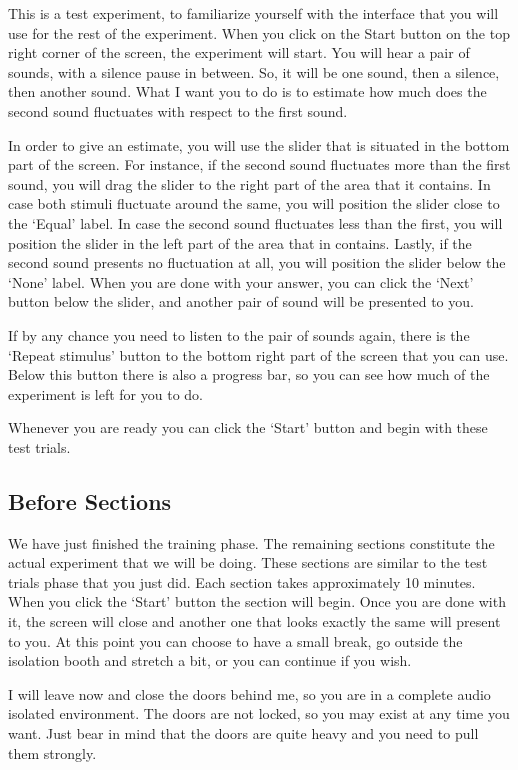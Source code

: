 \documentclass[a4paper]{article}
\begin{document}
This is a test experiment, to familiarize yourself with the interface that you
will use for the rest of the experiment. When you click on the Start button
on the top right corner of the screen, the experiment will start. You will
hear a pair of sounds, with a silence pause in between. So, it will be one
sound, then a silence, then another sound. What I want you to do is to estimate
how much does the second sound fluctuates with respect to the first sound.

In order to give an estimate, you will use the slider that is situated in the
bottom part of the screen. For instance, if the second sound fluctuates more
than the first sound, you will drag the slider to the right part of the area
that it contains. In case both stimuli fluctuate around the same, you will
position the slider close to the `Equal' label. In case the second sound
fluctuates less than the first, you will position the slider in the left part
of the area that in contains. Lastly, if the second sound presents no
fluctuation at all, you will position the slider below the `None' label. When
you are done with your answer, you can click the `Next' button below the slider,
and another pair of sound will be presented to you.

If by any chance you need to listen to the pair of sounds again, there is the
`Repeat stimulus' button to the bottom right part of the screen that you can
use. Below this button there is also a progress bar, so you can see how much of
the experiment is left for you to do.

Whenever you are ready you can click the `Start' button and begin with these
test trials.


\subsection{Before Sections} %
\label{sub:before_sections}

We have just finished the training phase. The remaining sections constitute the
actual experiment that we will be doing. These sections are similar to the test
trials phase that you just did. Each section takes approximately 10 minutes.
When you click the `Start' button the section will begin. Once you are done with
it, the screen will close and another one that looks exactly the same will
present to you. At this point you can choose to have a small break, go outside
the isolation booth and stretch a bit, or you can continue if you wish.

I will leave now and close the doors behind me, so you are in a complete audio
isolated environment. The doors are not locked, so you may exist at any time
you want. Just bear in mind that the doors are quite heavy and you need to pull
them strongly.


\end{document}
